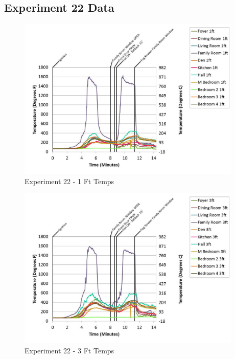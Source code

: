 \documentclass{article}
\begin{document}
\begin{appendices}
		\clearpage
\clearpage		\large
\subsection{Experiment 22 Data} \label{App:Exp22Results} 

	\begin{figure}[h!]
		\centering
		\includegraphics[height=3.05in]{0_Images/Results_Charts/Exp_22_Charts/1FtTemps.pdf}
		\caption{Experiment 22 - 1 Ft Temps}
	\end{figure}
 

	\begin{figure}[h!]
		\centering
		\includegraphics[height=3.05in]{0_Images/Results_Charts/Exp_22_Charts/3FtTemps.pdf}
		\caption{Experiment 22 - 3 Ft Temps}
	\end{figure}
 
	\clearpage


\end{appendices}
\end{document}
